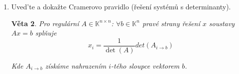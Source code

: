 \documentclass[10pt,a4paper]{article}
\theoremstyle{plain}
\newtheorem{veta}{Věta}
\begin{document}
\begin{enumerate}
\begin{veta}
\begin{proof}
\[ \begin{vmatrix}
\rule[1ex]{5em}{0.4pt}\\
0\ ...\ 0\ 1\ 0\ ...\ 0 \\
\rule[.5ex]{5em}{0.4pt}
\end{vmatrix} = \begin{vmatrix}
\rule[1ex]{5em}{0.4pt}\\
\rule[1ex]{1.5em}{0.4pt}\ \ e_j^T\ \rule[1ex]{1.5em}{0.4pt}\\
\rule[.5ex]{5em}{0.4pt}
\end{vmatrix} = (-1)^{i+1} \begin{vmatrix}
\rule[1ex]{1.5em}{0.4pt}\ \ e_j^T\ \rule[1ex]{1.5em}{0.4pt}\\
\rule[1ex]{5em}{0.4pt}\\
\rule[.5ex]{5em}{0.4pt}
\end{vmatrix}
 = (-1)^{i+1+j+1} \begin{vmatrix}
e_1^T \rule[1ex]{3.2em}{0.4pt}\\
\rule[1ex]{5em}{0.4pt}\\
\rule[.5ex]{5em}{0.4pt}
\end{vmatrix}  \]


\[
 = (-1)^{i+j} \det \left( \ 
\begin{array}{|c|c|}
\hline
1 & 0^T \\
\hline
0 & A^{i,j} \\
\hline
\end{array} \  \right)
\]

Nenulové budou permutace s pevným bodem $p(1)=1$, ostatní lze pominout, to odpovídá permutacím $S_{n-1}$.

\[ = (-1)^{i+j} det(A^{i,j})\]

Tedy pro první rovnici:

\[ = \sum^n_{j=1} a_{i,j}(-1)^{i+j}det(A^{i,j})\]



\end{proof}
\end{veta}

\item Uved'te a dokažte Cramerovo pravidlo (řešení systémů s determinanty).

\begin{veta}
Pro regulární $A \in \mathbb{K}^{n \times n}$: $\forall b \in \mathbb{K}^n$ pravé strany řešení $x$ soustavy $Ax = b$ splňuje
  \[x_i = \frac1{\det(A)}det(A_{i \to b})\]

Kde $A_{i \to b}$ získáme nahrazením $i$-tého sloupce vektorem $b$.


\end{veta}
\end{enumerate}
\end{document}

